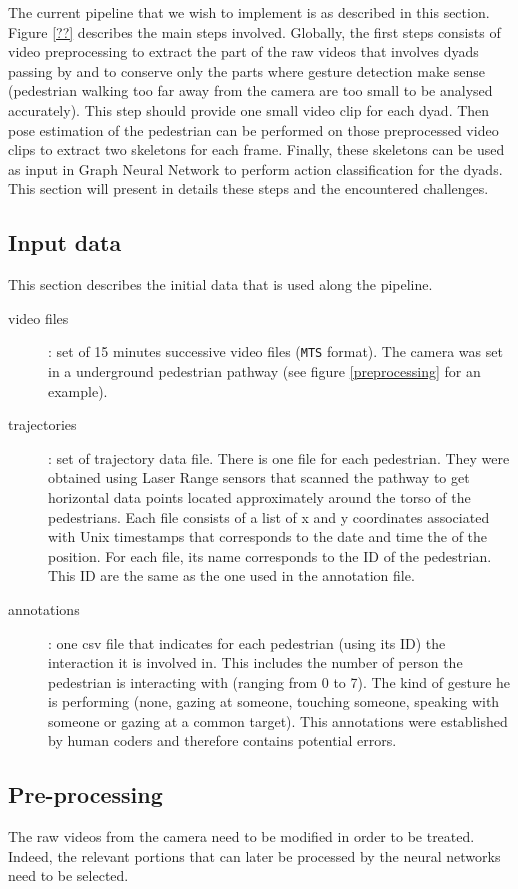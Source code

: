 \documentclass[12pt,a4paper,twoside]{article}
\begin{document}
The current pipeline that we wish to implement is as described in this section. Figure \ref{??} describes the main steps involved. Globally, the first steps consists of video preprocessing to extract the part of the raw videos that involves dyads passing by and to conserve only the parts where gesture detection make sense (pedestrian walking too far away from the camera are too small to be analysed accurately). This step should provide one small video clip for each dyad. Then pose estimation of the pedestrian can be performed on those preprocessed video clips to extract two skeletons for each frame. Finally, these skeletons can be used as input in Graph Neural Network to perform action classification for the dyads. This section will present in details these steps and the encountered challenges.  

\subsection{Input data}
This section describes the initial data that is used along the pipeline. 

\begin{description}
    \item[video files]: set of 15 minutes successive video files (\texttt{MTS} format). The camera was set in a underground pedestrian pathway (see figure \ref{preprocessing} for an example).
    \item[trajectories]: set of trajectory data file. There is one file for each pedestrian. They were obtained using Laser Range sensors that scanned the pathway to get horizontal data points located approximately around the torso of the pedestrians. Each file consists of a list of x and y coordinates associated with Unix timestamps that corresponds to the date and time the of the position. For each file, its name corresponds to the ID of the pedestrian. This ID are the same as the one used in the annotation file.
    \item[annotations]: one csv file that indicates for each pedestrian (using its ID) the interaction it is involved in. This includes the number of person the pedestrian is interacting with (ranging from 0 to 7). The kind of gesture he is performing (none, gazing at someone, touching someone, speaking with someone or gazing at a common target). This annotations were established by human coders and therefore contains potential errors.
\end{description}

\subsection{Pre-processing}
The raw videos from the camera need to be modified in order to be treated. Indeed, the relevant portions that can later be processed by the neural networks need to be selected. 
\end{document}
